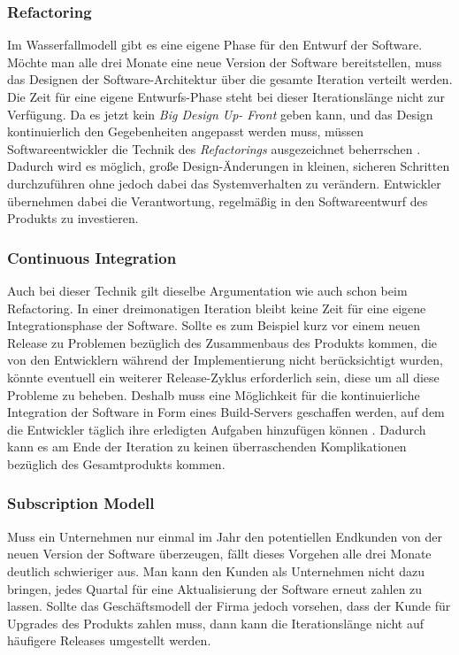\subsubsection{Refactoring}
\label{minisec:refactoring}
Im Wasserfallmodell gibt es eine eigene Phase für den Entwurf der Software.
Möchte man alle drei Monate eine neue Version der Software bereitstellen, muss
das Designen der Software-Architektur über die gesamte Iteration verteilt
werden. Die Zeit für eine eigene Entwurfs-Phase steht bei dieser
Iterationslänge nicht zur Verfügung. Da es jetzt kein \emph{Big Design Up-
Front} geben kann, und das Design kontinuierlich den Gegebenheiten angepasst
werden muss, müssen Softwareentwickler die Technik des \emph{Refactorings}
ausgezeichnet beherrschen \cite{fowler1999refactoring}. Dadurch wird es möglich, große Design-Änderungen in
kleinen, sicheren Schritten durchzuführen ohne jedoch dabei das
Systemverhalten zu verändern. Entwickler übernehmen dabei die Verantwortung,
regelmäßig in den Softwareentwurf des Produkts zu investieren.

\subsubsection{Continuous Integration}
\label{minisec:continuous-integration}
Auch bei dieser Technik gilt dieselbe Argumentation wie auch schon beim
Refactoring. In einer dreimonatigen Iteration bleibt keine Zeit für eine
eigene Integrationsphase der Software. Sollte es zum Beispiel kurz vor einem neuen
Release zu Problemen bezüglich des Zusammenbaus des Produkts kommen, die von
den Entwicklern während der Implementierung nicht berücksichtigt wurden,
könnte eventuell ein weiterer Release-Zyklus erforderlich sein, diese um all
diese Probleme zu beheben. Deshalb muss eine Möglichkeit für die
kontinuierliche Integration der Software in Form eines Build-Servers
geschaffen werden, auf dem die Entwickler täglich ihre erledigten Aufgaben
hinzufügen können \cite{duvall2007continuous}. Dadurch kann es am Ende der Iteration zu keinen überraschenden Komplikationen bezüglich des Gesamtprodukts kommen.

\subsubsection{Subscription Modell}
\label{minisec:subscription-modell}
Muss ein Unternehmen nur einmal im Jahr den potentiellen Endkunden von der
neuen Version der Software überzeugen, fällt dieses Vorgehen alle drei Monate
deutlich schwieriger aus. Man kann den Kunden als Unternehmen nicht dazu
bringen, jedes Quartal für eine Aktualisierung der Software erneut zahlen zu
lassen. Sollte das Geschäftsmodell der Firma jedoch vorsehen, dass der Kunde
für Upgrades des Produkts zahlen muss, dann kann die Iterationslänge nicht auf
häufigere Releases umgestellt werden. 

